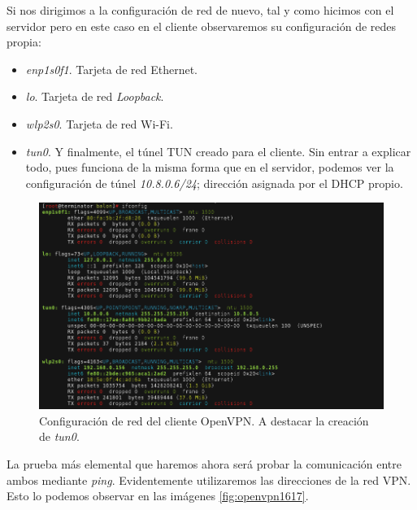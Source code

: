\documentclass[a4paper, 11pt, titlepage]{article}
\begin{document}
        Si nos dirigimos a la configuración de red de nuevo, tal y como hicimos con el servidor
        pero en este caso en el cliente observaremos su configuración de redes propia:

        \begin{itemize}
            \item \textit{enp1s0f1}. Tarjeta de red Ethernet.
            \item \textit{lo}. Tarjeta de red \textit{Loopback}.
            \item \textit{wlp2s0}. Tarjeta de red Wi-Fi.
            \item \textit{tun0}. Y finalmente, el túnel TUN creado para el cliente. Sin entrar 
            a explicar todo, pues funciona de la misma forma que en el servidor, podemos ver la
            configuración de túnel \textit{10.8.0.6/24}; dirección asignada por el DHCP propio.
        \end{itemize}

        \begin{figure}[htp]
            \centering
            \includegraphics[width=1\textwidth]{resources/openvpn15.png}
            \caption{Configuración de red del cliente OpenVPN. A destacar la creación de \textit{tun0}.}
            \label{}
        \end{figure}   

        La prueba más elemental que haremos ahora será probar la comunicación entre ambos mediante
        \textit{ping}. Evidentemente utilizaremos las direcciones de la red VPN. Esto lo podemos
        observar en las imágenes \ref{fig:openvpn1617}.
\end{document}
